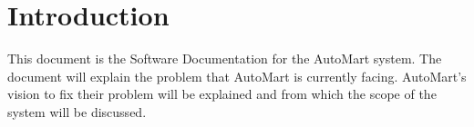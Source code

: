 \section{Introduction}
This document is the Software Documentation for the AutoMart system. The document will explain the problem that AutoMart is currently facing. AutoMart's vision to fix their problem will be explained and from which the scope of the system will be discussed.